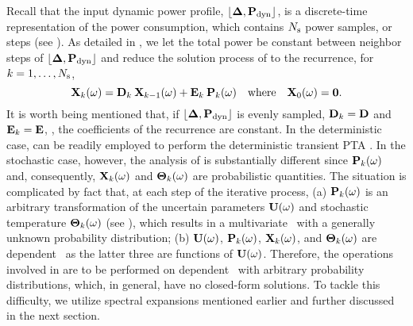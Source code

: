 Recall that the input dynamic power profile, $\profPdyn$, is a discrete-time representation of the power consumption, which contains $N_\text{s}$ power samples, or steps (see ). As detailed in , we let the total power be constant between neighbor steps of $\profPdyn$ and reduce the solution process of  to the recurrence, for $k = 1, \dotsc, N_\text{s}$,
\begin{equation} \elabel{recurrence}
  \vX_k(\o) = \mCF_k \: \vX_{k - 1}(\o) + \mCS_k \: \vP_k(\o) \hspace{1em} \text{where} \hspace{1em} \vX_0(\o) = \vZero.
\end{equation}
It is worth being mentioned that, if $\profPdyn$ is evenly sampled, $\mCF_k = \mCF$ and $\mCS_k = \mCS$, \ie, the coefficients of the recurrence are constant. In the deterministic case,  can be readily employed to perform the deterministic transient PTA \cite{thiele2011, ukhov2012}. In the stochastic case, however, the analysis of  is substantially different since $\mathbf{P}_k(\omega)$ and, consequently, $\mathbf{X}_k(\omega)$ and ${\boldsymbol\Theta}_k(\omega)$ are probabilistic quantities. The situation is complicated by fact that, at each step of the iterative process, (a) $\mathbf{P}_k(\omega)$ is an arbitrary transformation of the uncertain parameters $\mathbf{U}(\omega)$ and stochastic temperature ${\boldsymbol\Theta}_k(\omega)$ (see ), which results in a multivariate \rv\ with a generally unknown probability distribution; (b) $\mathbf{U}(\omega)$, $\mathbf{P}_k(\omega)$, $\mathbf{X}_k(\omega)$, and ${\boldsymbol\Theta}_k(\omega)$ are dependent \rvs\ as the latter three are functions of $\mathbf{U}(\omega)$. Therefore, the operations involved in  are to be performed on dependent \rvs\ with arbitrary probability distributions, which, in general, have no closed-form solutions. To tackle this difficulty, we utilize spectral expansions mentioned earlier and further discussed in the next section.
